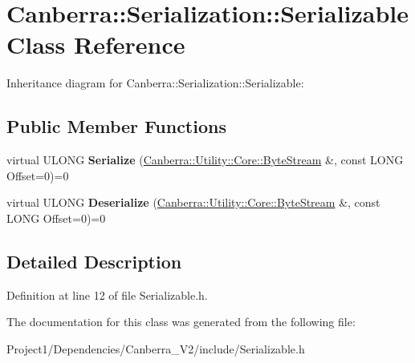 \hypertarget{class_canberra_1_1_serialization_1_1_serializable}{}\section{Canberra\+:\+:Serialization\+:\+:Serializable Class Reference}
\label{class_canberra_1_1_serialization_1_1_serializable}


Inheritance diagram for Canberra\+:\+:Serialization\+:\+:Serializable\+:
\subsection*{Public Member Functions}
\begin{DoxyCompactItemize}
\item 
\mbox{\label{class_canberra_1_1_serialization_1_1_serializable_a19b5d226ca748ca5fb9aca0078165537}} 
virtual U\+L\+O\+NG {\bfseries Serialize} (\hyperlink{class_canberra_1_1_utility_1_1_core_1_1_byte_stream}{Canberra\+::\+Utility\+::\+Core\+::\+Byte\+Stream} \&, const L\+O\+NG Offset=0)=0
\item 
\mbox{\label{class_canberra_1_1_serialization_1_1_serializable_ab8f9a9f50d0abfa31f2e35a4bd8189d3}} 
virtual U\+L\+O\+NG {\bfseries Deserialize} (\hyperlink{class_canberra_1_1_utility_1_1_core_1_1_byte_stream}{Canberra\+::\+Utility\+::\+Core\+::\+Byte\+Stream} \&, const L\+O\+NG Offset=0)=0
\end{DoxyCompactItemize}


\subsection{Detailed Description}


Definition at line 12 of file Serializable.\+h.



The documentation for this class was generated from the following file\+:\begin{DoxyCompactItemize}
\item 
Project1/\+Dependencies/\+Canberra\+\_\+\+V2/include/Serializable.\+h\end{DoxyCompactItemize}
